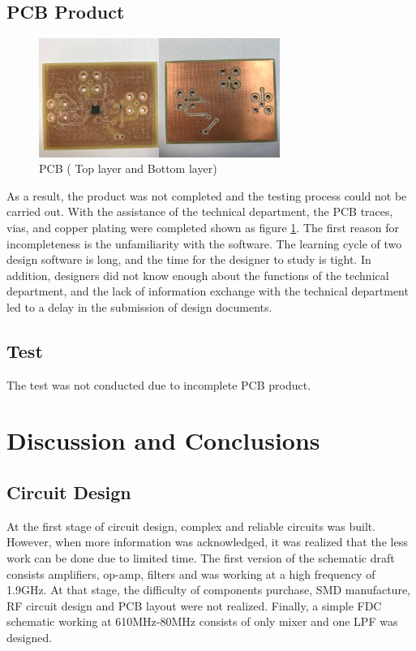 \documentclass[12pt, a4paper]{report}
\begin{document}
\section{PCB Product}

\begin{figure}[htbp]     \begin{centering}
    \includegraphics[width=0.7\textwidth]{img/e1.png}
    \caption{\label{Fig:e1}PCB ( Top layer and Bottom layer)}
    \end{centering}
\end{figure}


As a result, the product was not completed and the testing process could not be carried out. With the assistance of the technical department, the PCB traces, vias, and copper plating were completed shown as figure \ref{Fig:e1}. The first reason for incompleteness is the unfamiliarity with the software. The learning cycle of two design software is long, and the time for the designer to study is tight. In addition, designers did not know enough about the functions of the technical department, and the lack of information exchange with the technical department led to a delay in the submission of design documents.

\section{Test}

The test was not conducted due to incomplete PCB product.

\chapter{Discussion and Conclusions}



\section{Circuit Design}

At the first stage of circuit design, complex and reliable circuits was built. However, when more information was acknowledged, it was realized that the less work can be done due to limited time. The first version of the schematic draft consists amplifiers, op-amp, filters and was working at a high frequency of 1.9GHz. At that stage, the difficulty of components purchase, SMD manufacture, RF circuit design and PCB layout were not realized. Finally, a simple FDC schematic working at 610MHz-80MHz consists of only mixer and one LPF was designed.
\end{document}
